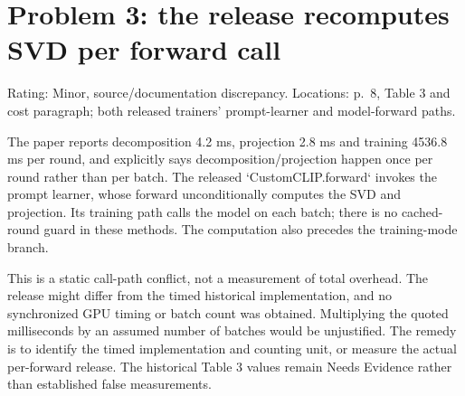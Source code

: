 \documentclass[10pt]{article}
\begin{document}
\section*{Problem 3: the release recomputes SVD per forward call}
Rating: Minor, source/documentation discrepancy. Locations: p. 8, Table 3 and cost paragraph; both released trainers’ prompt-learner and model-forward paths.\par
The paper reports decomposition 4.2 ms, projection 2.8 ms and training 4536.8 ms per round, and explicitly says decomposition/projection happen once per round rather than per batch. The released `CustomCLIP.forward` invokes the prompt learner, whose forward unconditionally computes the SVD and projection. Its training path calls the model on each batch; there is no cached-round guard in these methods. The computation also precedes the training-mode branch.\par
This is a static call-path conflict, not a measurement of total overhead. The release might differ from the timed historical implementation, and no synchronized GPU timing or batch count was obtained. Multiplying the quoted milliseconds by an assumed number of batches would be unjustified. The remedy is to identify the timed implementation and counting unit, or measure the actual per-forward release. The historical Table 3 values remain Needs Evidence rather than established false measurements.\par
\end{document}

